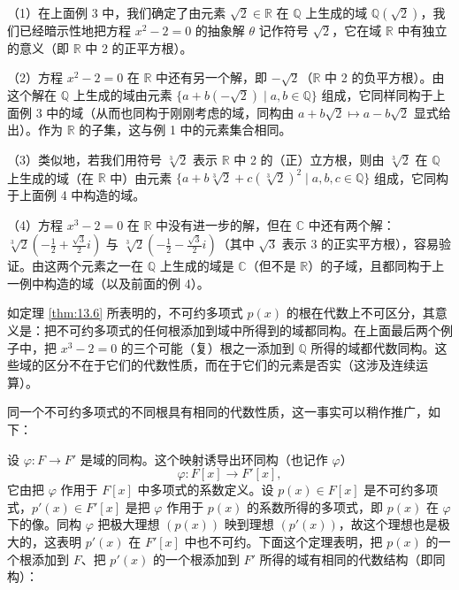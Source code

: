 \begin{example}
（1）在上面例 3 中，我们确定了由元素 \(\sqrt{2} \in \mathbb{R}\) 在 \(\mathbb{Q}\) 上生成的域 \(\mathbb{Q}(\sqrt{2})\)，我们已经暗示性地把方程 \(x^2-2 = 0\) 的抽象解 \(\theta\) 记作符号 \(\sqrt{2}\)，它在域 \(\mathbb{R}\) 中有独立的意义（即 \(\mathbb{R}\) 中 2 的正平方根）。

（2）方程 \(x^2-2 = 0\) 在 \(\mathbb{R}\) 中还有另一个解，即 \(-\sqrt{2}\)（\(\mathbb{R}\) 中 2 的负平方根）。由这个解在 \(\mathbb{Q}\) 上生成的域由元素 \(\{a+b(-\sqrt{2}) \mid a, b \in \mathbb{Q}\}\) 组成，它同样同构于上面例 3 中的域（从而也同构于刚刚考虑的域，同构由 \(a+b\sqrt{2} \mapsto a-b\sqrt{2}\) 显式给出）。作为 \(\mathbb{R}\) 的子集，这与例 1 中的元素集合相同。

（3）类似地，若我们用符号 \(\sqrt[3]{2}\) 表示 \(\mathbb{R}\) 中 2 的（正）立方根，则由 \(\sqrt[3]{2}\) 在 \(\mathbb{Q}\) 上生成的域（在 \(\mathbb{R}\) 中）由元素 \(\{a+b\sqrt[3]{2}+c(\sqrt[3]{2})^2 \mid a, b, c \in \mathbb{Q}\}\) 组成，它同构于上面例 4 中构造的域。

（4）方程 \(x^3-2 = 0\) 在 \(\mathbb{R}\) 中没有进一步的解，但在 \(\mathbb{C}\) 中还有两个解：\(\sqrt[3]{2}\left(-\frac{1}{2}+\frac{\sqrt{3}}{2}i\right)\) 与 \(\sqrt[3]{2}\left(-\frac{1}{2}-\frac{\sqrt{3}}{2}i\right)\)（其中 \(\sqrt{3}\) 表示 3 的正实平方根），容易验证。由这两个元素之一在 \(\mathbb{Q}\) 上生成的域是 \(\mathbb{C}\)（但不是 \(\mathbb{R}\)）的子域，且都同构于上一例中构造的域（以及前面的例 4）。
\end{example}

如定理 \ref{thm:13.6} 所表明的，不可约多项式 \(p(x)\) 的根在代数上不可区分，其意义是：把不可约多项式的任何根添加到域中所得到的域都同构。在上面最后两个例子中，把 \(x^3-2 = 0\) 的三个可能（复）根之一添加到 \(\mathbb{Q}\) 所得的域都代数同构。这些域的区分不在于它们的代数性质，而在于它们的元素是否实（这涉及连续运算）。

同一个不可约多项式的不同根具有相同的代数性质，这一事实可以稍作推广，如下：

设 \(\varphi : F \to F'\) 是域的同构。这个映射诱导出环同构（也记作 \(\varphi\)）
\[
\varphi : F[x] \to F'[x],
\]
它由把 \(\varphi\) 作用于 \(F[x]\) 中多项式的系数定义。设 \(p(x) \in F[x]\) 是不可约多项式，\(p'(x) \in F'[x]\) 是把 \(\varphi\) 作用于 \(p(x)\) 的系数所得的多项式，即 \(p(x)\) 在 \(\varphi\) 下的像。同构 \(\varphi\) 把极大理想 \((p(x))\) 映到理想 \((p'(x))\)，故这个理想也是极大的，这表明 \(p'(x)\) 在 \(F'[x]\) 中也不可约。下面这个定理表明，把 \(p(x)\) 的一个根添加到 \(F\)、把 \(p'(x)\) 的一个根添加到 \(F'\) 所得的域有相同的代数结构（即同构）：

